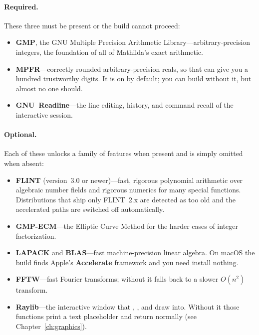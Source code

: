 \paragraph{Required.} These three must be present or the build cannot proceed:
\begin{itemize}
  \item \textbf{GMP}, the GNU Multiple Precision Arithmetic Library---arbitrary-precision
        integers, the foundation of all of Mathilda's exact arithmetic.
  \item \textbf{MPFR}---correctly rounded arbitrary-precision reals, so that 
        can give you a hundred trustworthy digits. It is on by default; you can build
        without it, but almost no one should.
  \item \textbf{GNU~Readline}---the line editing, history, and command recall of the
        interactive session.
\end{itemize}

\paragraph{Optional.} Each of these unlocks a family of features when present and is
simply omitted when absent:
\begin{itemize}
  \item \textbf{FLINT} (version~3.0 or newer)---fast, rigorous polynomial arithmetic
        over algebraic number fields and rigorous numerics for many special
        functions. Distributions that ship only FLINT~2.x are detected as too old
        and the accelerated paths are switched off automatically.
  \item \textbf{GMP-ECM}---the Elliptic Curve Method for the harder cases of integer
        factorization.
  \item \textbf{LAPACK} and \textbf{BLAS}---fast machine-precision linear algebra. On
        macOS the build finds Apple's \textbf{Accelerate} framework and you need
        install nothing.
  \item \textbf{FFTW}---fast Fourier transforms; without it  falls back to
        a slower $O(n^2)$ transform.
  \item \textbf{Raylib}---the interactive window that , , and 
        draw into. Without it those functions print a text placeholder and return
        normally (see Chapter~\ref{ch:graphics}).
\end{itemize}


